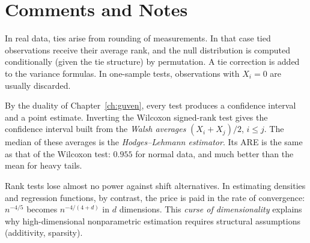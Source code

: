 \documentclass[main.tex]{subfiles}
\begin{document}
\section{Comments and Notes}

\begin{remark}[Ties]
In real data, ties arise from rounding of measurements. In that case tied observations receive their average rank, and the null distribution is computed conditionally (given the tie structure) by permutation. A tie correction is added to the variance formulas. In one-sample tests, observations with $X_i=0$ are usually discarded.
\end{remark}

\begin{remark}
By the duality of Chapter~\ref{ch:guven}, every test produces a confidence interval and a point estimate. Inverting the Wilcoxon signed-rank test gives the confidence interval built from the \emph{Walsh averages} $(X_i+X_j)/2$, $i\le j$. The median of these averages is the \emph{Hodges--Lehmann estimator}. Its ARE is the same as that of the Wilcoxon test: $0.955$ for normal data, and much better than the mean for heavy tails.
\end{remark}

\begin{remark}
Rank tests lose almost no power against shift alternatives. In estimating densities and regression functions, by contrast, the price is paid in the rate of convergence: $n^{-4/5}$ becomes $n^{-4/(4+d)}$ in $d$ dimensions. This \emph{curse of dimensionality} explains why high-dimensional nonparametric estimation requires structural assumptions (additivity, sparsity).
\end{remark}

\end{document}
